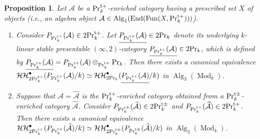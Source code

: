 \documentclass[leqno,12pt]{amsart}
\theoremstyle{plain}
\newtheorem{Proposition}[Theorem]{Proposition}
\theoremstyle{definition}
\newcommand{\HH}{\operatorname{\mathcal{HH}}}
\newcommand{\AAA}{\mathcal{A}}
\newcommand{\PR}{\textup{Pr}}
\newcommand{\PRTT}{\textup{Pr}^{\textup{t}+}}
\newcommand{\PRTTT}{\textup{Pr}^{\textup{t}\pm}}
\newcommand{\Mod}{\operatorname{Mod}}
\newcommand{\Fun}{\operatorname{Fun}}
\newcommand{\Alg}{\operatorname{Alg}}
\newcommand{\End}{\operatorname{End}}
\begin{document}
\begin{Proposition}
\label{comparison1}
Let $\AAA$ be a $\PRTT_k$-enriched category having a prescribed set $X$ of objects (i.e., an algebra object $\mathcal{A}\in \Alg_1(\End(\Fun(X,\PRTT_k)))$). 

\begin{enumerate}
\item
Consider $P_{\PRTT_k}(\AAA)\in 2\PRTT_k$. Let  $\underline{P_{\PRTT_k}(\AAA)}\in 2\PR_k$ denote
its underlying $k$-linear stable presentable $(\infty,2)$-category $\underline{P_{\PRTT_k}(\AAA)}\in 2\PR_k$, which is defined by $\underline{P_{\PRTT_k}(\AAA)}=P_{\PRTT_k}(\AAA)\otimes_{\PRTT_k}\PR_k$.
Then there exists a canonical equivalence $\HH^\bullet_{2\PRTT_k}(P_{\PRTT_k}(\AAA)/k)\simeq \HH^\bullet_{2\PR_k}(\underline{P_{\PRTT_k}(\AAA)}/k)$ in $\Alg_3(\Mod_k)$.

\item
Suppose that $\AAA=\widehat{\AAA}$ is the $\PRTT_k$-enriched category obtained from a $\PRTTT_k$-enriched category $\widehat{\AAA}$.
Consider $P_{\PRTTT_k}(\widehat{\AAA})\in 2\PRTTT_k$ and $P_{\PRTT_k}(\widehat{\AAA})\in 2\PRTT_k$.
Then there exists a canonical equivalence $\HH^\bullet_{2\PRTT_k}(P_{\PRTT_k}(\widehat{\AAA})/k)\simeq \HH^\bullet_{2\PRTTT_k}(P_{\PRTTT_k}(\widehat{\AAA})/k)$ in $\Alg_3(\Mod_k)$.

\end{enumerate}
\end{Proposition}
\end{document}
